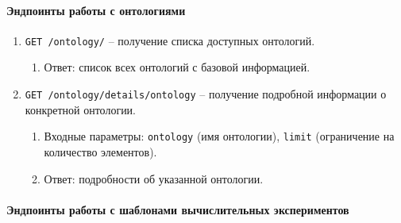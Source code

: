 \paragraph{Эндпоинты работы с онтологиями}

\begin{enumerate}
\item \texttt{GET /ontology/} -- получение списка доступных онтологий.
\begin{enumerate}[label=\arabic{enumi}.\arabic*.]
\item Ответ: список всех онтологий с базовой информацией.
\end{enumerate}

\item \texttt{GET /ontology/details/{ontology}} -- получение подробной информации о конкретной онтологии.
\begin{enumerate}[label=\arabic{enumi}.\arabic*.]
\item Входные параметры: \texttt{ontology} (имя онтологии), \texttt{limit} (ограничение на количество элементов).
\item Ответ: подробности об указанной онтологии.
\end{enumerate}
\end{enumerate}

\paragraph{Эндпоинты работы с шаблонами вычислительных экспериментов}

